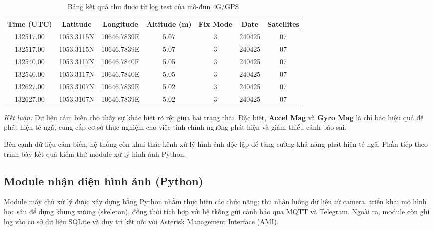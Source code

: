 \begin{table}[h]
\centering
\caption{Bảng kết quả thu được từ log test của mô-đun 4G/GPS}
\label{tab:gps_data}
\begin{tabular}{|c|c|c|c|c|c|c|}
\hline
\textbf{Time (UTC)} & \textbf{Latitude} & \textbf{Longitude} & \textbf{Altitude (m)} & \textbf{Fix Mode} & \textbf{Date} & \textbf{Satellites} \\
\hline
132517.00 & 1053.3115N & 10646.7839E & 5.07 & 3 & 240425 & 07 \\
132517.00 & 1053.3115N & 10646.7839E & 5.07 & 3 & 240425 & 07 \\
132540.00 & 1053.3117N & 10646.7840E & 5.05 & 3 & 240425 & 07 \\
132540.00 & 1053.3117N & 10646.7840E & 5.05 & 3 & 240425 & 07 \\
132627.00 & 1053.3107N & 10646.7839E & 5.02 & 3 & 240425 & 07 \\
132627.00 & 1053.3107N & 10646.7839E & 5.02 & 3 & 240425 & 07 \\
\hline
\end{tabular}
\end{table}

\textit{Kết luận:} Dữ liệu cảm biến cho thấy sự khác biệt rõ rệt giữa hai trạng thái. Đặc biệt, \textbf{Accel Mag} và \textbf{Gyro Mag} là chỉ báo hiệu quả để phát hiện té ngã, cung cấp cơ sở thực nghiệm cho việc tinh chỉnh ngưỡng phát hiện và giảm thiểu cảnh báo sai.

Bên cạnh dữ liệu cảm biến, hệ thống còn khai thác kênh xử lý hình ảnh độc lập để tăng cường khả năng phát hiện té ngã. Phần tiếp theo trình bày kết quả kiểm thử module xử lý hình ảnh Python.

\subsection{Module nhận diện hình ảnh (Python)}
\label{sec:python_vision}

Module máy chủ xử lý được xây dựng bằng Python nhằm thực hiện các chức năng: thu nhận luồng dữ liệu từ camera, triển khai mô hình học sâu để dựng khung xương (skeleton), đồng thời tích hợp với hệ thống gửi cảnh báo qua MQTT và Telegram. Ngoài ra, module còn ghi log vào cơ sở dữ liệu SQLite và duy trì kết nối với Asterisk Management Interface (AMI).  


